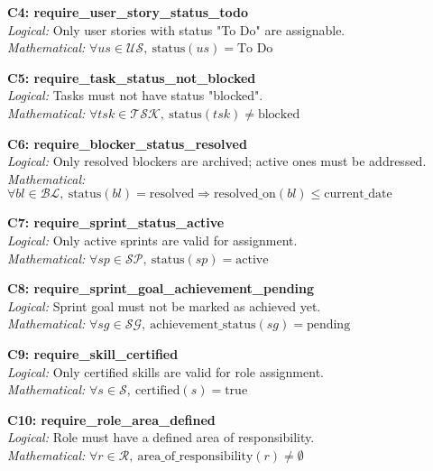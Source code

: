 \documentclass[12pt]{article}
\begin{document}
    \item \textbf{C4: require\_user\_story\_status\_todo} \\
    \textit{Logical:} Only user stories with status "To Do" are assignable. \\
    \textit{Mathematical:} $ \forall us \in \mathcal{US},\ \text{status}(us) = \text{To Do} $

    \item \textbf{C5: require\_task\_status\_not\_blocked} \\
    \textit{Logical:} Tasks must not have status "blocked". \\
    \textit{Mathematical:} $ \forall tsk \in \mathcal{TSK},\ \text{status}(tsk) \neq \text{blocked} $

    \item \textbf{C6: require\_blocker\_status\_resolved} \\
    \textit{Logical:} Only resolved blockers are archived; active ones must be addressed. \\
    \textit{Mathematical:} $ \forall bl \in \mathcal{BL},\ \text{status}(bl) = \text{resolved} \Rightarrow \text{resolved\_on}(bl) \leq \text{current\_date} $

    \item \textbf{C7: require\_sprint\_status\_active} \\
    \textit{Logical:} Only active sprints are valid for assignment. \\
    \textit{Mathematical:} $ \forall sp \in \mathcal{SP},\ \text{status}(sp) = \text{active} $

    \item \textbf{C8: require\_sprint\_goal\_achievement\_pending} \\
    \textit{Logical:} Sprint goal must not be marked as achieved yet. \\
    \textit{Mathematical:} $ \forall sg \in \mathcal{SG},\ \text{achievement\_status}(sg) = \text{pending} $

    \item \textbf{C9: require\_skill\_certified} \\
    \textit{Logical:} Only certified skills are valid for role assignment. \\
    \textit{Mathematical:} $ \forall s \in \mathcal{S},\ \text{certified}(s) = \text{true} $

    \item \textbf{C10: require\_role\_area\_defined} \\
    \textit{Logical:} Role must have a defined area of responsibility. \\
    \textit{Mathematical:} $ \forall r \in \mathcal{R},\ \text{area\_of\_responsibility}(r) \neq \emptyset $
\end{document}
